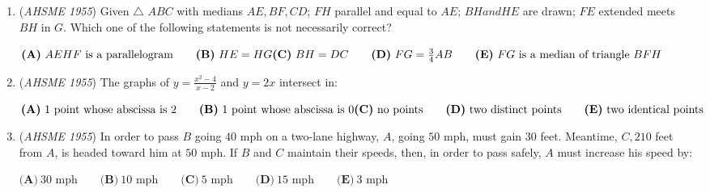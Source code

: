 \begin{enumerate}
 $\textbf{(A)}\ \text{always equal}\qquad\textbf{(B)}\ \text{never equal}\qquad\textbf{(C)}\ \text{equal whenever }a+b+c=1\\ \textbf{(D)}\ \text{equal when }a+b+c=0\qquad\textbf{(E)}\ \text{equal only when }a=b=c=0$


	\item (\textit{AHSME 1955}) Given $\triangle$ $ABC$ with medians $AE, BF, CD$; $FH$ parallel and equal to $AE$; $BH and HE$ are drawn; $FE$ extended meets $BH$ in $G$. 
Which one of the following statements is not necessarily correct? 


 $\textbf{(A)}\ AEHF\text{ is a parallelogram}\qquad\textbf{(B)}\ HE=HG\\ \textbf{(C)}\ BH=DC\qquad\textbf{(D)}\ FG=\frac{3}{4}AB\qquad\textbf{(E)}\ FG\text{ is a median of triangle }BFH$


	\item (\textit{AHSME 1955}) The graphs of $y=\frac{x^2-4}{x-2}$ and $y=2x$ intersect in: 


 $\textbf{(A)}\ \text{1 point whose abscissa is 2}\qquad\textbf{(B)}\ \text{1 point whose abscissa is 0}\\ \textbf{(C)}\ \text{no points}\qquad\textbf{(D)}\ \text{two distinct points}\qquad\textbf{(E)}\ \text{two identical points}$


	\item (\textit{AHSME 1955}) In order to pass $B$ going $40$ mph on a two-lane highway, $A$, going $50$ mph, must gain $30$ feet. 
Meantime, $C, 210$ feet from $A$, is headed toward him at $50$ mph. If $B$ and $C$ maintain their speeds, 
then, in order to pass safely, $A$ must increase his speed by: 


 $\textbf{(A)}\ \text{30 mph}\qquad\textbf{(B)}\ \text{10 mph}\qquad\textbf{(C)}\ \text{5 mph}\qquad\textbf{(D)}\ \text{15 mph}\qquad\textbf{(E)}\ \text{3 mph}$


\end{enumerate}